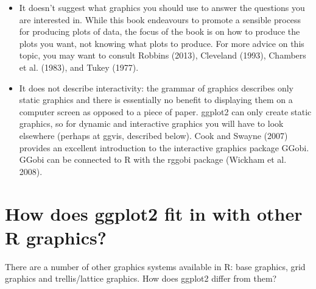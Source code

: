 \begin{itemize}
\item
  It doesn't suggest what graphics you should use to answer the
  questions you are interested in. While this book endeavours to promote
  a sensible process for producing plots of data, the focus of the book
  is on how to produce the plots you want, not knowing what plots to
  produce. For more advice on this topic, you may want to consult
  Robbins (2013), Cleveland (1993), Chambers et al. (1983), and Tukey
  (1977).
\item
  It does not describe interactivity: the grammar of graphics describes
  only static graphics and there is essentially no benefit to displaying
  them on a computer screen as opposed to a piece of paper. ggplot2 can
  only create static graphics, so for dynamic and interactive graphics
  you will have to look elsewhere (perhaps at ggvis, described below).
  Cook and Swayne (2007) provides an excellent introduction to the
  interactive graphics package GGobi. GGobi can be connected to R with
  the rggobi package (Wickham et al. 2008).
\end{itemize}

\hypertarget{how-does-ggplot2-fit-in-with-other-r-graphics}{%
\section{How does ggplot2 fit in with other R
graphics?}\label{how-does-ggplot2-fit-in-with-other-r-graphics}}

There are a number of other graphics systems available in R: base
graphics, grid graphics and trellis/lattice graphics. How does ggplot2
differ from them?

